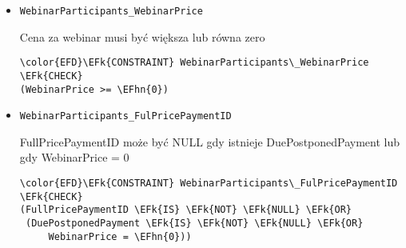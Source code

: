 \documentclass[11pt]{article}
\newcommand{\EFk}[1]{\textcolor{EFk}{\textbf{#1}}} %
\newcommand{\EFhn}[1]{\textcolor{EFhn}{#1}} %
\begin{document}
\begin{itemize}
\item \texttt{WebinarParticipants\_WebinarPrice}

Cena za webinar musi być większa lub równa zero
\begin{Code}
\begin{Verbatim}
\color{EFD}\EFk{CONSTRAINT} WebinarParticipants\_WebinarPrice \EFk{CHECK}
(WebinarPrice >= \EFhn{0})
\end{Verbatim}
\end{Code}
\item \texttt{WebinarParticipants\_FulPricePaymentID}

FullPricePaymentID może być NULL gdy istnieje DuePostponedPayment lub gdy WebinarPrice = 0
\begin{Code}
\begin{Verbatim}
\color{EFD}\EFk{CONSTRAINT} WebinarParticipants\_FulPricePaymentID \EFk{CHECK}
(FullPricePaymentID \EFk{IS} \EFk{NOT} \EFk{NULL} \EFk{OR}
 (DuePostponedPayment \EFk{IS} \EFk{NOT} \EFk{NULL} \EFk{OR}
     WebinarPrice = \EFhn{0}))
\end{Verbatim}
\end{Code}
\end{itemize}
\end{document}
